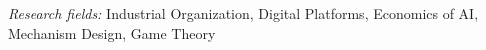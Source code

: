\par\vspace{1mm}
\noindent
{\footnotesize \textit{Research fields:} Industrial Organization, Digital Platforms, Economics of AI, Mechanism Design, Game Theory\par}

